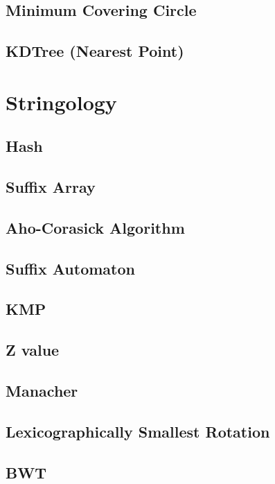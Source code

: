 \documentclass[a4paper,10pt,twocolumn,oneside]{article}
\begin{document}
\subsection{Minimum Covering Circle}

\subsection{KDTree (Nearest Point)}


\section{Stringology}
\subsection{Hash}

\subsection{Suffix Array}

\subsection{Aho-Corasick Algorithm}

\subsection{Suffix Automaton}

\subsection{KMP}

\subsection{Z value}

\subsection{Manacher}

\subsection{Lexicographically Smallest Rotation}

\subsection{BWT}

\end{document}

